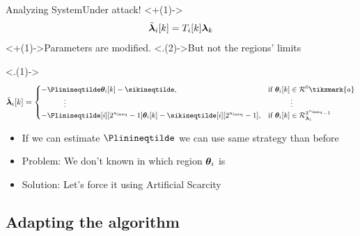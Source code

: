 \documentclass[aspectratio=169]{beamer}
\begin{document}
\begin{frame}{Analyzing System}{Under attack!}
  \centering
  \vspace{-1cm}
  \onslide<+(1)->{
    \begin{equation*}
      \tilde{\boldsymbol{\lambda}}_{i}[k]=T_{i}[k]\boldsymbol{\lambda}_{k}
    \end{equation*}
  }
  \onslide<+(1)->{Parameters are modified.} \onslide<.(2)->{But not the regions' limits}

  \onslide<.(1)->{
  \begin{equation*}
    \small
      \lambdaicheat[k]=
      \begin{cases}
        -\Plinineqtilde      \thetaik-\sikineqtilde      ,&\text{if }\thetaik\in\set{R}^{0}\tikzmark{a}\\
        \qquad\quad \vdots&\qquad\quad \vdots\\
        -\Plinineqtilde[i][2^{\nineq}-1]\thetaik-\sikineqtilde[i][2^{\nineq}-1],&\text{if}\ \thetaik \in\set{R}_{\lambdai}^{2^{\nineq}-1}\\
      \end{cases}
  \end{equation*}
  }

  \begin{itemize}[<+(2)->]
    \item If we can estimate $\Plinineqtilde$ we can use same strategy than before
    \item Problem: We don't known in which region $\boldsymbol{\theta}_{i}$ is
    \item Solution: Let's force it using Artificial Scarcity
  \end{itemize}
\end{frame}

\subsection{Adapting the algorithm}
\end{document}
